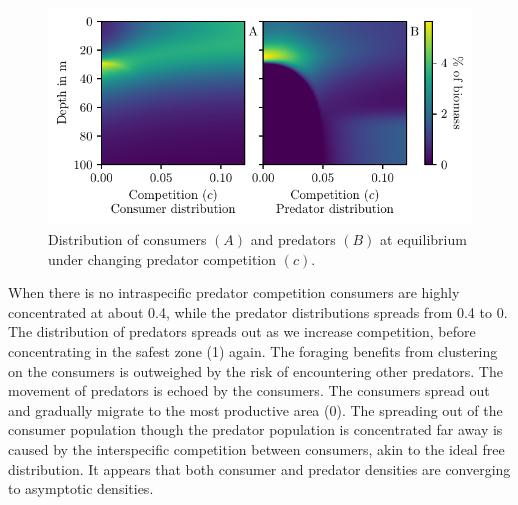 \begin{figure}[H]
  \caption{Distribution of consumers $(A)$ and predators $(B)$ at equilibrium under changing predator competition $(c)$.}
  \label{fig:strat_comp}
    \includegraphics{plots/increasing_competition_c.pdf}
\end{figure}

When there is no intraspecific predator competition consumers are highly concentrated at about 0.4, while the predator distributions spreads from 0.4 to 0. The distribution of predators spreads out as we increase competition, before concentrating in the safest zone (1) again. The foraging benefits from clustering on the consumers is outweighed by the risk of encountering other predators. The movement of predators is echoed by the consumers. The consumers spread out and gradually migrate to the most productive area (0). The spreading out of the consumer population though the predator population is concentrated far away is caused by the interspecific competition between consumers, akin to the ideal free distribution. It appears that both consumer and predator densities are converging to asymptotic densities. %

